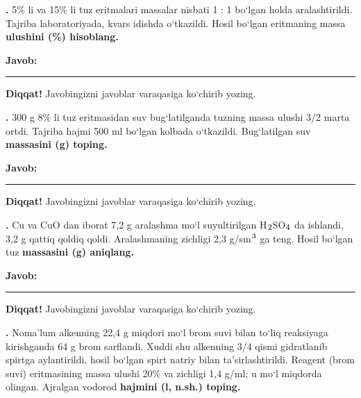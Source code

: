 \documentclass[11pt,a4paper]{article}
\renewcommand{\textsubscript}[1]{\ensuremath{_{\text{\fontsize{8}{8}\selectfont #1}}}}
\renewcommand{\textsuperscript}[1]{\ensuremath{^{\text{\fontsize{8}{8}\selectfont #1}}}}
\newcommand{\qn}[1]{\textbf{\fontsize{11.5}{13}\selectfont #1}}
\newcommand{\qsep}{\par\vspace{13pt}}
\newcommand{\javob}{\par\nopagebreak[4]\smallskip\noindent\textbf{Javob:} \rule[-2pt]{7.5cm}{0.4pt}\par\smallskip\noindent\textbf{Diqqat!} Javobingizni javoblar varaqasiga ko`chirib yozing.\par\medskip}
\begin{document}
\noindent\setlength{\fboxsep}{0pt}
\par\bigskip
\noindent\qn{36.} 5\% li va 15\% li tuz eritmalari massalar nisbati 1 : 1 bo`lgan holda aralashtirildi. Tajriba laboratoriyada, kvars idishda o`tkazildi. Hosil bo`lgan eritmaning massa \textbf{ulushini (\%) hisoblang.}
\javob\qsep
\noindent\qn{37.} 300 g 8\% li tuz eritmasidan suv bug`latilganda tuzning massa ulushi 3/2 marta ortdi. Tajriba hajmi 500 ml bo`lgan kolbada o`tkazildi. Bug`latilgan suv \textbf{massasini (g) toping.}
\javob\qsep
\noindent\qn{38.} Cu va CuO dan iborat 7,2 g aralashma mo`l suyultirilgan H\textsubscript{2}SO\textsubscript{4} da ishlandi, 3,2 g qattiq qoldiq qoldi. Aralashmaning zichligi 2,3 g/sm\textsuperscript{3} ga teng. Hosil bo`lgan tuz \textbf{massasini (g) aniqlang.}
\javob\qsep
\noindent\qn{39.} Noma'lum alkenning 22,4 g miqdori mo`l brom suvi bilan to`liq reaksiyaga kirishganda 64 g brom sarflandi. Xuddi shu alkenning 3/4 qismi gidratlanib spirtga aylantirildi, hosil bo`lgan spirt natriy bilan ta'sirlashtirildi. Reagent (brom suvi) eritmasining massa ulushi 20\% va zichligi 1,4 g/ml; u mo`l miqdorda olingan. Ajralgan vodorod \textbf{hajmini (l, n.sh.) toping.}
\end{document}
